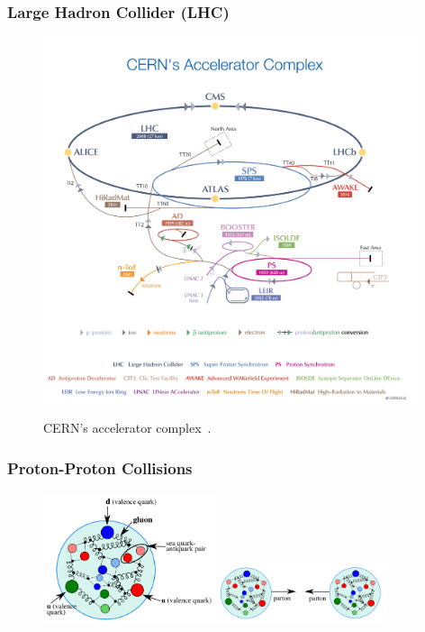 \begin{frame}\frametitle{Large Hadron Collider (LHC)}
\begin{figure}[htb]
  \begin{center}
    {\includegraphics[width=0.98\textwidth]{../figs/Exp/CERN_accelerator_complex2013.jpg}}
    \caption\tiny{CERN's accelerator complex~\cite{ref_fig_CERNacceleratorComplex}.}
    \label{fig:CERN_accelerator_complex}
  \end{center}
\end{figure}
\end{frame}%


\begin{frame}\frametitle{Proton-Proton Collisions}
\begin{figure}[htb]
  \begin{center}
    {\includegraphics[width=0.45\textwidth]{../figs/Intro/protonStructure.png}\includegraphics[width=0.45\textwidth]{../figs/Intro/ppCollision.png}}
  \end{center}
\end{figure}
\end{frame}%



